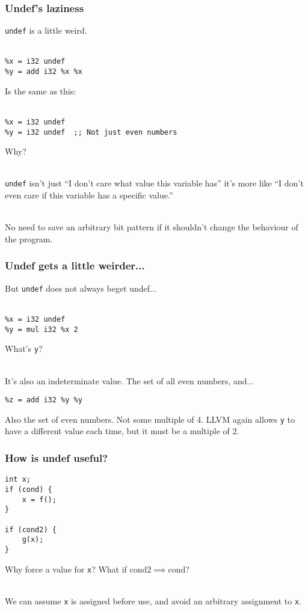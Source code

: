 \documentclass{beamer}
\begin{document}
  \begin{frame}[fragile]
    \frametitle{Undef's laziness}

    {\tt undef} is a little weird.\\~

\begin{lstlisting}
%x = i32 undef
%y = add i32 %x %x
\end{lstlisting}

    Is the same as this:\\~

\begin{lstlisting}
%x = i32 undef
%y = i32 undef  ;; Not just even numbers
\end{lstlisting}

    Why?\\~

    \pause

    {\tt undef} isn't just ``I don't care what value this
    variable has'' it's more like ``I don't even care if this variable
    has a specific value.''\\~

    No need to save an arbitrary bit pattern if it shouldn't change
    the behaviour of the program.
  \end{frame}

  \begin{frame}[fragile]
    \frametitle{Undef gets a little weirder...}

    But \texttt{undef} does not always beget undef...\\~

\begin{lstlisting}
%x = i32 undef
%y = mul i32 %x 2
\end{lstlisting}

    What's {\tt y}? \\~

    \pause

    It's also an indeterminate value. The set of all even numbers,
    and...

\begin{lstlisting}
%z = add i32 %y %y
\end{lstlisting}

    \pause

    Also the set of even numbers. Not some multiple of 4. LLVM again allows
    {\tt y} to have a different value each time, but it must be a
    multiple of 2.
  \end{frame}

\begin{frame}[fragile]
  \frametitle{How is undef useful?}

\begin{lstlisting}
int x;
if (cond) {
    x = f();
}

if (cond2) {
    g(x);
}
\end{lstlisting}

  Why force a value for {\tt x}? What if $\mathrm{cond2}
  \implies \mathrm{cond}$?\\~

  We can assume {\tt x} is assigned before use, and avoid an arbitrary
  assignment to {\tt x}.

\end{frame}
\end{document}
